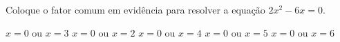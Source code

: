 Coloque o fator comum em evidência para resolver a equação $2x^2-6x=0$.

$x=0$ ou $x=3$
$x=0$ ou $x=2$
$x=0$ ou $x=4$
$x=0$ ou $x=5$
$x=0$ ou $x=6$


